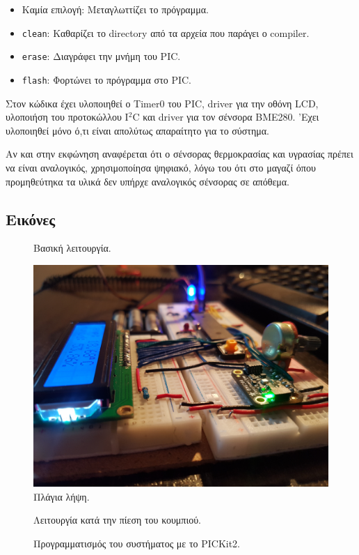 \documentclass{article}
\begin{document}
\begin{itemize}
	\item Καμία επιλογή: Μεταγλωττίζει το πρόγραμμα.
	\item \lstinline{clean}: Καθαρίζει το directory από τα αρχεία
		που παράγει ο compiler.
	\item \lstinline{erase}: Διαγράφει την μνήμη του PIC.
	\item \lstinline{flash}: Φορτώνει το πρόγραμμα στο PIC.
\end{itemize}

Στον κώδικα έχει υλοποιηθεί ο Timer0 του PIC, driver για την οθόνη LCD,
υλοποιήση του προτοκώλλου I$^2$C και driver για τον σένσορα BME280. 'Εχει
υλοποιηθεί μόνο ό,τι είναι απολύτως απαραίτητο για το σύστημα.

Αν και στην εκφώνηση αναφέρεται ότι ο σένσορας θερμοκρασίας και υγρασίας
πρέπει να είναι αναλογικός, χρησιμοποίησα ψηφιακό, λόγω του ότι στο μαγαζί
όπου προμηθεύτηκα τα υλικά δεν υπήρχε αναλογικός σένσορας σε απόθεμα.

\subsection{Εικόνες}

\begin{figure}[H]
        \centering
	\caption{Βασική λειτουργία.}
\end{figure}


\begin{figure}[H]
        \centering
	\includegraphics[width=\linewidth]{res/side.jpg}
	\caption{Πλάγια λήψη.}
\end{figure}

\begin{figure}[H]
        \centering
	\caption{Λειτουργία κατά την πίεση του κουμπιού.}
\end{figure}

\begin{figure}[H]
        \centering
	\caption{Προγραμματισμός του συστήματος με το PICKit2.}
\end{figure}
\end{document}
